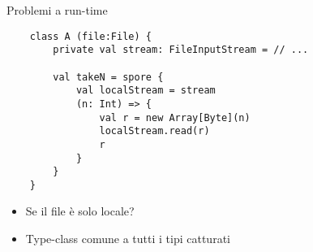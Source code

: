 \begin{frame}[fragile]{Problemi a run-time}
	\begin{lstlisting}
	class A (file:File) {
	    private val stream: FileInputStream = // ...
	
	    val takeN = spore {
	        val localStream = stream
	        (n: Int) => {
	            val r = new Array[Byte](n)
	            localStream.read(r)
	            r
	        }
	    }
	}
	\end{lstlisting}
	\begin{itemize}
		\item Se il file è solo locale?
		\item Type-class comune a tutti i tipi catturati 
	\end{itemize}
\end{frame}